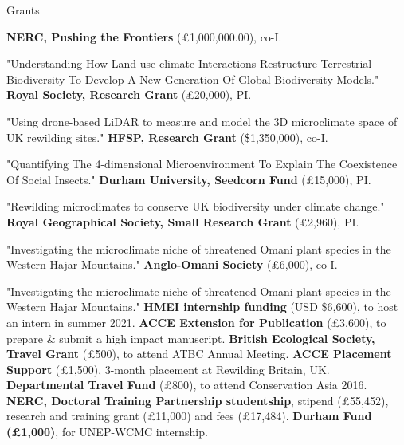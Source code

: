 \begin{rubric}{Grants}

\entry*[2024] \textbf{NERC, Pushing the Frontiers} (£1,000,000.00), co-I.
	\par \footnotesize "Understanding How Land-use-climate Interactions Restructure Terrestrial Biodiversity To Develop A New Generation Of Global Biodiversity Models." \normalsize
\entry*[2024] \textbf{Royal Society, Research Grant} (£20,000), PI.
	\par \footnotesize "Using drone-based LiDAR to measure and model the 3D microclimate space of UK rewilding sites." \normalsize
\entry*[2023] \textbf{HFSP, Research Grant} (\$1,350,000), co-I.
	\par \footnotesize "Quantifying The 4-dimensional Microenvironment To Explain The Coexistence Of Social Insects." \normalsize
\entry*[2023] \textbf{Durham University, Seedcorn Fund} (£15,000), PI.
	\par \footnotesize "Rewilding microclimates to conserve UK biodiversity under climate change." \normalsize
\entry*[2022] \textbf{Royal Geographical Society, Small Research Grant} (£2,960), PI.
	\par \footnotesize "Investigating the microclimate niche of threatened Omani plant species in the Western Hajar Mountains." \normalsize
\entry*[2022] \textbf{Anglo-Omani Society} (£6,000), co-I.
	\par \footnotesize "Investigating the microclimate niche of threatened Omani plant species in the Western Hajar Mountains." \normalsize
\entry*[2021] \textbf{HMEI internship funding} (USD \$6,600), to host an intern in summer 2021.
\entry*[2018] \textbf{ACCE Extension for Publication} (£3,600), to prepare \& submit a high impact manuscript.
\entry*[2018] \textbf{British Ecological Society, Travel Grant} (£500), to attend ATBC Annual Meeting.
\entry*[2016] \textbf{ACCE Placement Support} (£1,500), 3-month placement at Rewilding Britain, UK.
\entry*[2016] \textbf{Departmental Travel Fund} (£800), to attend Conservation Asia 2016.
\entry*[2014] \textbf{NERC, Doctoral Training Partnership studentship}, stipend (£55,452), research and training grant (£11,000) and fees (£17,484).
\entry*[2013] \textbf{Durham Fund (£1,000)}, for UNEP-WCMC internship.




\end{rubric}
